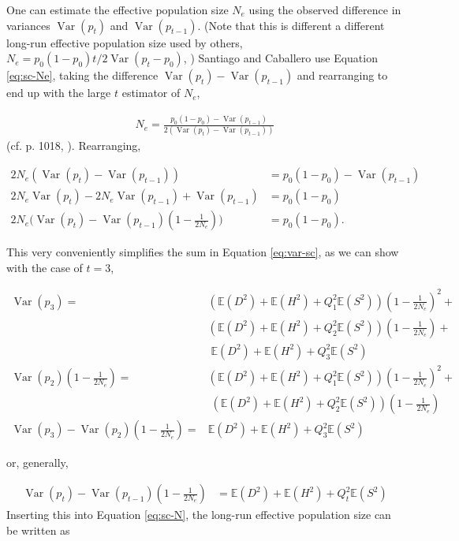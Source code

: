 \documentclass[11pt]{article}
\newcommand{\nnn}{\nonumber}
\newcommand{\E}{\mathbb{E}}
\DeclareMathOperator{\var}{Var}
\begin{document}
One can estimate the effective population size $N_e$ using the observed
difference in variances $\var(p_t)$ and $\var(p_{t-1})$. (Note that this is
different a different long-run effective population size used by others, $N_e =
p_0(1-p_0) t / 2\var(p_t - p_0)$, \cite{Crow1970-wm}) Santiago and
Caballero use Equation \eqref{eq:sc-Ne}, taking the difference $\var(p_t) -
\var(p_{t-1})$ and rearranging to end up with the large $t$ estimator of $N_e$, 

\begin{align}
  N_e = \frac{p_0(1-p_0) - \var(p_{t-1})}{2(\var(p_t) - \var(p_{t-1}))}
\end{align}
%
(cf. p. 1018, \cite{Santiago1995-hx}). Rearranging,

\begin{align}
  2N_e(\var(p_t) - \var(p_{t-1})) &= p_0 (1-p_0) - \var(p_{t-1}) \nonumber \\
  2N_e \var(p_t) - 2N_e \var(p_{t-1}) + \var(p_{t-1}) &= p_0(1-p_0) \nonumber \\
  2N_e \bigg(\var(p_t) - \var(p_{t-1}) \left(1 - \frac{1}{2N_e} \right)\bigg) &= p_0(1-p_0).
  \label{eq:sc-N}
\end{align}

This very conveniently simplifies the sum in Equation \eqref{eq:var-sc}, as we
can show with the case of $t=3$,

\begin{align}
  \var(p_3) = &\left(\E(D^2)+\E(H^2)+Q_1^2 \E(S^2)\right) \left(1-\frac{1}{2 N_e}\right)^2 + \nonumber \\
              &\left(\E(D^2)+\E(H^2)+Q_2^2 \E(S^2)\right) \left(1-\frac{1}{2 N_e}\right) + \nonumber \\
              &\;\E(D^2)+\E(H^2)+Q_3^2 \E(S^2) \nonumber \\
  \var(p_2)\left(1-\frac{1}{2N_e}\right) = &\left(\E(D^2)+\E(H^2)+Q_1^2 \E(S^2)\right) \left(1-\frac{1}{2N_e}\right)^2 + \nonumber \\
                                         &\;(\E(D^2)+\E(H^2)+Q_2^2 \E(S^2)) \left(1-\frac{1}{2N_e}\right) \nonumber \\
  \var(p_3) - \var(p_2)\left(1-\frac{1}{2N_e}\right) = &\E(D^2) + \E(H^2) + Q_3^2 \E(S^2) \nnn
\end{align}

or, generally, 

\begin{align}
  \var(p_t) - \var(p_{t-1})\left(1-\frac{1}{2N_e}\right) &= \E(D^2) + \E(H^2) + Q_t^2 \E(S^2)
\end{align}
%
Inserting this into Equation \eqref{eq:sc-N}, the long-run effective population
size can be written as
\end{document}
